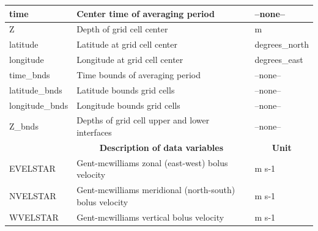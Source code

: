 \begin{longtable}{|m{}|m{}|m{}|}
time &Center time of averaging period &--none--  \\ \hline
Z &Depth of grid cell center &m  \\ \hline
latitude &Latitude at grid cell center &degrees\_north  \\ \hline
longitude &Longitude at grid cell center &degrees\_east  \\ \hline
time\_bnds &Time bounds of averaging period &--none--  \\ \hline
latitude\_bnds &Latitude bounds grid cells &--none--  \\ \hline
longitude\_bnds &Longitude bounds grid cells &--none--  \\ \hline
Z\_bnds &Depths of grid cell upper and lower interfaces &--none--  \\ \hline
\rowcolor{lightgray} \multicolumn{1}{|c|}{\textbf{Variables}} & \multicolumn{1}{|c|}{\textbf{Description of data variables}} &  \multicolumn{1}{|c|}{\textbf{Unit}}\\ \hline
EVELSTAR &Gent-mcwilliams zonal (east-west) bolus velocity &m s-1  \\ \hline
NVELSTAR &Gent-mcwilliams meridional (north-south) bolus velocity &m s-1  \\ \hline
WVELSTAR &Gent-mcwilliams vertical bolus velocity &m s-1  \\ \hline
\end{longtable}

\newp
\pagebreak
